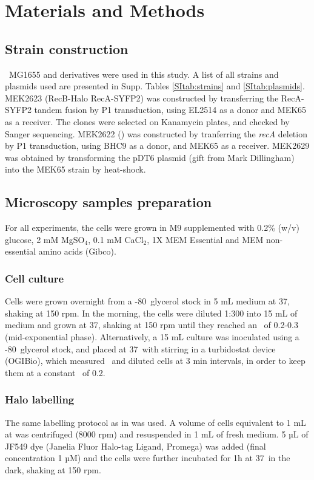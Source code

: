 \section*{Materials and Methods}

\subsection*{Strain construction}
\ecoli\ MG1655 and derivatives were used in this study. A list of all strains and plasmids used are presented in Supp. Tables \ref{SItab:strains} and \ref{SItab:plasmids}.
MEK2623 (RecB-Halo RecA-SYFP2) was constructed by transferring the RecA-SYFP2 tandem fusion by P1 transduction, using EL2514\cite{Wiktor2021} as a donor and MEK65\cite{Lepore2019a} as a receiver. The clones were selected on Kanamycin plates, and checked by Sanger sequencing. MEK2622 (\dreca) was constructed by tranferring the \textit{recA} deletion by P1 transduction, using BHC9 as a donor, and MEK65 as a receiver. MEK2629 was obtained by transforming the pDT6 plasmid (gift from Mark Dillingham) into the MEK65 strain by heat-shock.

\subsection*{Microscopy samples preparation}
For all experiments, the cells were grown in M9 supplemented with 0.2\% (w/v) glucose, 2 mM MgSO$_4$, 0.1 mM CaCl$_2$, 1X MEM Essential and MEM non-essential amino acids (Gibco).
\subsubsection*{Cell culture}
Cells were grown overnight from a -80\celsius\ glycerol stock in 5 mL medium at 37\celsius, shaking at 150 rpm. In the morning, the cells were diluted 1:300 into 15 mL of medium and grown at 37\celsius, shaking at 150 rpm until they reached an \od\ of 0.2-0.3 (mid-exponential phase).
Alternatively, a 15 mL culture was inoculated using a -80\celsius\ glycerol stock, and placed at 37\celsius\ with stirring in a turbidostat device (OGIBio), which measured \od\ and diluted cells at 3 min intervals, in order to keep them at a constant \od\ of 0.2.
\subsubsection*{Halo labelling}
The same labelling protocol as in \cite{Lepore2023} was used. A volume of cells equivalent to 1 mL at  was centrifuged (8000 rpm) and resuspended in 1 mL of fresh medium. 5 µL of JF549 dye (Janelia Fluor Halo-tag Ligand, Promega) was added (final concentration 1 µM) and the cells were further incubated for 1h at 37\celsius\ in the dark, shaking at 150 rpm.

